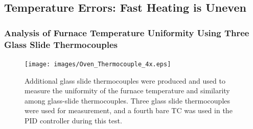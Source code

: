 \documentclass[12pt,oneside,english]{article}
\begin{document}
	
	\subsection{Temperature Errors: Fast Heating is Uneven} \label{sec:Temperature_Uniformity_Three_Slides}

	\subsubsection{Analysis of Furnace Temperature Uniformity Using Three Glass Slide Thermocouples}

	\begin{figure}
		\texttt{[image: images/Oven\_Thermocouple\_4x.eps]}
		\caption{Additional glass slide thermocouples were produced and used to measure the uniformity of the furnace temperature and similarity among glass-slide thermocouples.  Three glass slide thermocouples were used for measurement, and a fourth bare TC was used in the PID controller during this test.}
	\end{figure}
\end{document}
